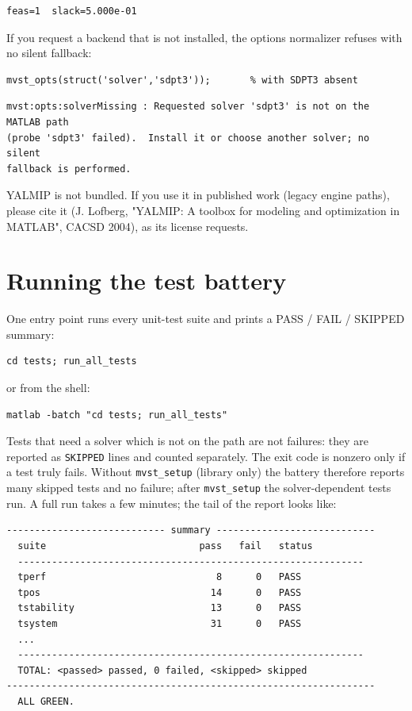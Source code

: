 \documentclass[11pt,oneside]{report}
\newcommand{\code}[1]{\texttt{#1}}
\begin{document}
\begin{lstlisting}[style=outputstyle]
feas=1  slack=5.000e-01
\end{lstlisting}

If you request a backend that is not installed, the options normalizer refuses
with no silent fallback:

\begin{lstlisting}[style=matlabstyle]
mvst_opts(struct('solver','sdpt3'));       % with SDPT3 absent
\end{lstlisting}

\begin{lstlisting}[style=outputstyle]
mvst:opts:solverMissing : Requested solver 'sdpt3' is not on the MATLAB path
(probe 'sdpt3' failed).  Install it or choose another solver; no silent
fallback is performed.
\end{lstlisting}

YALMIP is not bundled. If you use it in published work (legacy engine paths), please cite it (J. Lofberg, "YALMIP: A
toolbox for modeling and optimization in MATLAB", CACSD 2004), as its license
requests.

\hypertarget{running-the-test-battery}{%
\section{Running the test battery}\label{running-the-test-battery}}

One entry point runs every unit-test suite and prints a PASS / FAIL / SKIPPED
summary:

\begin{lstlisting}[style=matlabstyle]
cd tests; run_all_tests
\end{lstlisting}

or from the shell:

\begin{lstlisting}[style=outputstyle]
matlab -batch "cd tests; run_all_tests"
\end{lstlisting}

Tests that need a solver which is not on the path are not failures: they are
reported as \code{SKIPPED} lines and counted separately. The exit code is nonzero
only if a test truly fails. Without \code{mvst\_setup} (library only) the battery
therefore reports many skipped tests and no failure; after \code{mvst\_setup} the
solver-dependent tests run. A full run takes a few minutes; the tail of the
report looks like:

\begin{lstlisting}[style=outputstyle]
---------------------------- summary ----------------------------
  suite                           pass   fail   status
  -------------------------------------------------------------
  tperf                              8      0   PASS
  tpos                              14      0   PASS
  tstability                        13      0   PASS
  tsystem                           31      0   PASS
  ...
  -------------------------------------------------------------
  TOTAL: <passed> passed, 0 failed, <skipped> skipped
-----------------------------------------------------------------
  ALL GREEN.
\end{lstlisting}
\end{document}
